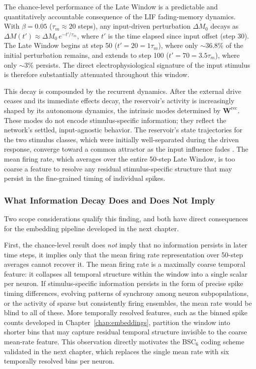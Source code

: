 The chance-level performance of the Late Window is a predictable and quantitatively accountable consequence of the LIF fading-memory dynamics. With $\beta = 0.05$ ($\tau_m \approx 20$ steps), any input-driven perturbation $\Delta M_0$ decays as $\Delta M(t') \approx \Delta M_0\, e^{-t'/\tau_m}$, where $t'$ is the time elapsed since input offset (step 30). The Late Window begins at step 50 ($t' = 20 = 1\tau_m$), where only $\sim$36.8\% of the initial perturbation remains, and extends to step 100 ($t' = 70 = 3.5\tau_m$), where only $\sim$3\% persists. The direct electrophysiological signature of the input stimulus is therefore substantially attenuated throughout this window.

This decay is compounded by the recurrent dynamics. After the external drive ceases and its immediate effects decay, the reservoir's activity is increasingly shaped by its autonomous dynamics, the intrinsic modes determined by $\mathbf{W}^{\text{rec}}$. These modes do not encode stimulus-specific information; they reflect the network's settled, input-agnostic behavior. The reservoir's state trajectories for the two stimulus classes, which were initially well-separated during the driven response, converge toward a common attractor as the input influence fades \cite{Sussillo2009, Barak2017}. The mean firing rate, which averages over the entire 50-step Late Window, is too coarse a feature to resolve any residual stimulus-specific structure that may persist in the fine-grained timing of individual spikes.

\subsubsection{What Information Decay Does and Does Not Imply}

Two scope considerations qualify this finding, and both have direct consequences for the embedding pipeline developed in the next chapter.

First, the chance-level result does \emph{not} imply that no information persists in later time steps, it implies only that the mean firing rate representation over 50-step averages cannot recover it. The mean firing rate is a maximally coarse temporal feature: it collapses all temporal structure within the window into a single scalar per neuron. If stimulus-specific information persists in the form of precise spike timing differences, evolving patterns of synchrony among neuron subpopulations, or the activity of sparse but consistently firing ensembles, the mean rate would be blind to all of these. More temporally resolved features, such as the binned spike counts developed in Chapter~\ref{chap:embeddings}, partition the window into shorter bins that may capture residual temporal structure invisible to the coarse mean-rate feature. This observation directly motivates the BSC$_6$ coding scheme validated in the next chapter, which replaces the single mean rate with six temporally resolved bins per neuron.

